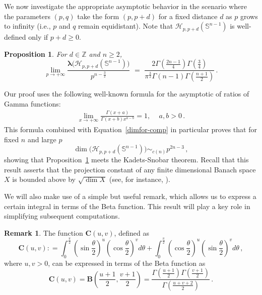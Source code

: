 \documentclass[12pt]{amsart}
\numberwithin{subsection}{section}
\newtheorem{proposition}[theorem]{Proposition}
\theoremstyle{definition}
\newtheorem{remark}[theorem]{Remark}
\theoremstyle{remark}
\begin{document}
We now investigate the appropriate asymptotic behavior in the scenario where the parameters \( (p,q) \) take the form \( (p, p+d) \) for a fixed distance \( d \) as \( p \) grows to infinity (i.e., \( p \) and \( q \) remain equidistant). Note that \( \mathcal{H}_{p,p+d}(\mathbb{S}^{n-1}) \) is well-defined only if \( p + d \geq 0 \).

\begin{proposition} \label{asymp-harm}
For \( d \in \mathbb{Z} \) and \( n \ge 2 \),
\[\lim_{p \to + \infty}  \frac{\boldsymbol{\lambda}\big(\mathcal{H}_{p,p+d}(\mathbb{S}^{n-1})\big)}{p^{n- \frac{3}{2}}}\,\,=\,\,\frac{2\Gamma\left(\frac{2n-1}{4} \right) \Gamma\left(\frac{3}{4}\right) }{\pi^{\frac{3}{2}}\Gamma(n-1)\Gamma\left(\frac{n + 1}{2}\right)}\,.\]
\end{proposition}



Our proof uses the  following well-known formula for the asymptotic of ratios of Gamma functions:
\begin{align}\label{mainasym}
\lim_{x\to + \infty} \frac{\Gamma(x + a)}{ \Gamma(x + b) x^{a-b}} = 1, \quad\,   a, b >0\,.
\end{align}
This formula combined with  Equation~\eqref{dimfor-comp} in particular proves  that for fixed  $n $ and large  $p $
\[
\dim \big(\mathcal{H}_{p,p+d}(\mathbb{S}^{n-1})\big) \sim_{c(n)} p^{2n -3}\,,
\]
showing that Proposition~\ref{asymp-harm} meets the Kadets-Snobar theorem. Recall that this result asserts that the projection constant
of any finite dimensional Banach space $X$ is bounded above by  $ \sqrt{\dim X}  $  (see, for instance, \cite[Theorem 10, III.B.]{wojtaszczyk1996banach}).

We will also make use of a simple but useful remark, which allows us to express a certain integral in terms of the Beta function. This
result will play a key role in simplifying subsequent computations.

\begin{remark}\label{rmk: function c}
The function $\boldsymbol{C}(u,v)$, defined as
\begin{equation}\label{eq: definition of C}
\boldsymbol{C}(u,v): = \int_{0}^{\frac{\pi}{2}} \left( \sin \frac{\theta}{2} \right)^{u} \left( \cos \frac{\theta}{2} \right)^{v}d\theta
+
\int_{0}^{\frac{\pi}{2}}  \left( \cos \frac{\theta}{2} \right)^{u} \left( \sin \frac{\theta}{2} \right)^{v}d\theta\,,
\end{equation}
where $u,v > 0$, can be expressed in terms of the Beta function as
\[
\boldsymbol{C}(u,v) = \boldsymbol{B}\left(\frac{u+1}{2}, \frac{v+1}{2}\right) = \frac{\Gamma\left(\frac{u+1}{2}\right) \Gamma\left(\frac{v+1}{2}\right)}{\Gamma\left(\frac{u+v+2}{2}\right)}\,.
\]
\end{remark}
\end{document}
